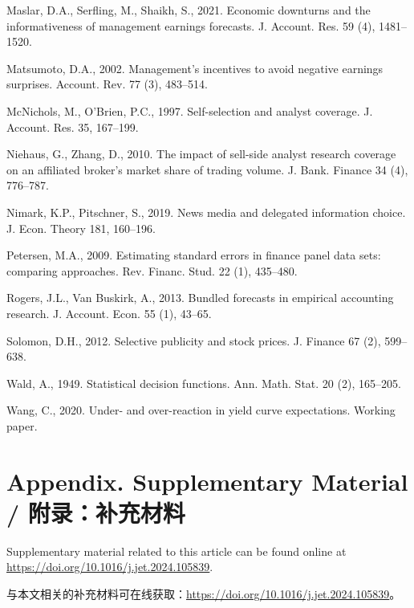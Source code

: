 \documentclass[12pt,a4paper]{article}
\newenvironment{original}
  {\par\medskip\noindent\ignorespaces}
  {\par\medskip}
\newenvironment{translation}
  {\par\noindent{\color{transblue}\ignorespaces}}
  {\par\bigskip}
\begin{document}
\begin{original}
\noindent Maslar, D.A., Serfling, M., Shaikh, S., 2021. Economic downturns and the informativeness of management earnings forecasts. J. Account. Res. 59 (4), 1481--1520.

\noindent Matsumoto, D.A., 2002. Management's incentives to avoid negative earnings surprises. Account. Rev. 77 (3), 483--514.

\noindent McNichols, M., O'Brien, P.C., 1997. Self-selection and analyst coverage. J. Account. Res. 35, 167--199.

\noindent Niehaus, G., Zhang, D., 2010. The impact of sell-side analyst research coverage on an affiliated broker's market share of trading volume. J. Bank. Finance 34 (4), 776--787.

\noindent Nimark, K.P., Pitschner, S., 2019. News media and delegated information choice. J. Econ. Theory 181, 160--196.

\noindent Petersen, M.A., 2009. Estimating standard errors in finance panel data sets: comparing approaches. Rev. Financ. Stud. 22 (1), 435--480.

\noindent Rogers, J.L., Van Buskirk, A., 2013. Bundled forecasts in empirical accounting research. J. Account. Econ. 55 (1), 43--65.

\noindent Solomon, D.H., 2012. Selective publicity and stock prices. J. Finance 67 (2), 599--638.

\noindent Wald, A., 1949. Statistical decision functions. Ann. Math. Stat. 20 (2), 165--205.

\noindent Wang, C., 2020. Under- and over-reaction in yield curve expectations. Working paper.
\end{original}

\bigskip
{}

\vfill
\section*{Appendix. Supplementary Material / 附录：补充材料}
\begin{original}
Supplementary material related to this article can be found online at \url{https://doi.org/10.1016/j.jet.2024.105839}.
\end{original}
\begin{translation}
与本文相关的补充材料可在线获取：\url{https://doi.org/10.1016/j.jet.2024.105839}。
\end{translation}
\end{document}
